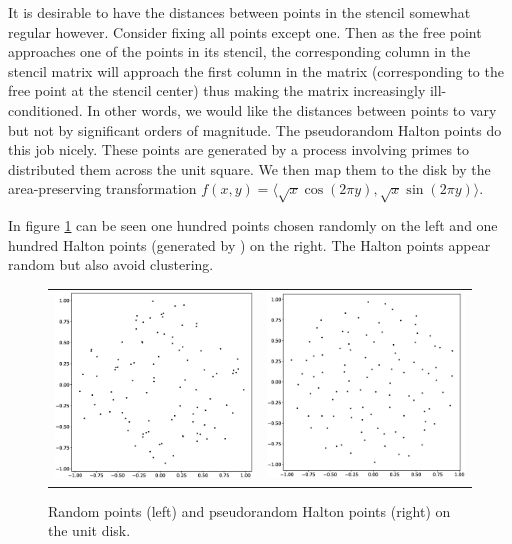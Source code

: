 \documentclass[12pt]{article}
\begin{document}
It is desirable to have the distances between points in the stencil somewhat regular however. Consider fixing all points except one. Then as the free point approaches one of the points in its stencil, the corresponding column in the stencil matrix will approach the first column in the matrix (corresponding to the free point at the stencil center) thus making the matrix increasingly ill-conditioned. In other words, we would like the distances between points to vary but not by significant orders of magnitude. The pseudorandom Halton \cite{Halton1960} points do this job nicely. These points are generated by a process involving primes to distributed them across the unit square. We then map them to the disk by the area-preserving transformation $f(x, y) = \langle \sqrt{x}\cos(2\pi y), \sqrt{x}\sin(2 \pi y) \rangle$.


In figure \ref{randomhalton} can be seen one hundred points chosen randomly on the left and one hundred Halton points (generated by \cite{Burkardt2016}) on the right. The Halton points appear random but also avoid clustering.

\begin{figure}[ht]
	\centering
	\begin{tabular}{cc}
		\includegraphics[width=.5\textwidth]{random_100_disk.eps} & \includegraphics[width=.5\textwidth]{halton_100_disk.eps} \\
	\end{tabular}
	\caption{Random points (left) and pseudorandom Halton points (right) on the unit disk.}
	\label{randomhalton}
\end{figure}
\end{document}
